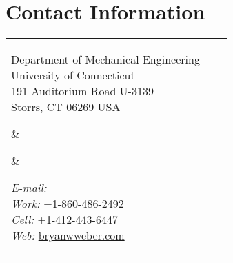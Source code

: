 



\listoftodos
\vspace{1em}

\section{Contact Information}

%
%
\newlength{\rcollength}\setlength{\rcollength}{2.05in}%
\newlength{\spacewidth}\setlength{\spacewidth}{30pt}
%
\begin{tabular}[t]{@{}p{\textwidth-\rcollength-\spacewidth}@{}p{\spacewidth}@{}p{\rcollength}}%

\parbox{\textwidth-\rcollength-\spacewidth}{%
Department of Mechanical Engineering\\
University of Connecticut\\
191 Auditorium Road U-3139\\
Storrs, CT 06269 USA}

&
{\vrule width 0.5pt}
\parbox[m][4\baselineskip]{\spacewidth}{} &

\parbox{\rcollength}{%
\textit{E-mail:} \\
\textit{Work:} +1-860-486-2492 \\
\textit{Cell:} +1-412-443-6447 \\
\textit{Web:} \href{http://bryanwweber.com}{bryanwweber.com}
}%

\end{tabular}

